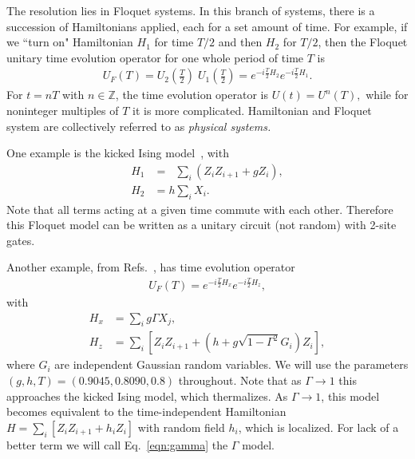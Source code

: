 \documentclass[a4paper,12pt]{article}
\newcommand{\nn}{\nonumber\\}
\begin{document}
The resolution lies in Floquet systems. In this branch of systems, there is a succession of Hamiltonians applied, each for a set amount of time. For example, if we ``turn on" Hamiltonian $H_1$ for time $T/2$ and then $H_2$ for $T/2$, then the Floquet unitary time evolution operator for one whole period of time $T$ is 
\begin{align}
U_F(T) = U_2\left(\frac{T}{2}\right)\; U_1\left(\frac{T}{2}\right) = e^{-i\frac{T}{2}H_2} e^{-i\frac{T}{2}H_1}.
\end{align}
For $t=nT$ with $n\in \mathbb{Z}$, the time evolution operator is $U(t)=U^n(T),$ while for noninteger multiples of $T$ it is more complicated. Hamiltonian and Floquet system are collectively referred to as \emph{physical systems.}

One example is the kicked Ising model~\cite{vonKeyserlingkHydro}, with 
\begin{align}
H_1 &= \phantom{h}\sum_i\left(Z_iZ_{i+1}+gZ_i\right),\nn
H_2 &= h\sum_iX_i. \label{eqn:kicked}
\end{align}
Note that all terms acting at a given time commute with each other. Therefore this Floquet model can be written as a unitary circuit (not random) with 2-site gates. 

Another example, from Refs.~\cite{ZhangFloq, ChenOtoc}, has time evolution operator 
\begin{align}
U_F(T) = e^{-i\frac{T}{2}H_x}e^{-i\frac{T}{2}H_z}, \label{eqn:gamma}
\end{align}
with
\begin{align}
H_x &= \sum_i g\Gamma X_j,\nn
H_z &= \sum_i \left[Z_iZ_{i+1} + (h+g\sqrt{1-\Gamma^2}G_i)Z_i\right],
\end{align}
where $G_i$ are independent Gaussian random variables. We will use the parameters $(g,h,T) = (0.9045,0.8090,0.8)$ throughout.
Note that as $\Gamma\to1$ this approaches the kicked Ising model, which thermalizes. As $\Gamma\to1$, this model becomes equivalent to the time-independent Hamiltonian $H=\sum_i\left[Z_iZ_{i+1} + h_iZ_i\right]$ with random field $h_i$, which is localized. For lack of a better term we will call Eq.~\ref{eqn:gamma} the $\Gamma$ model.
\end{document}
